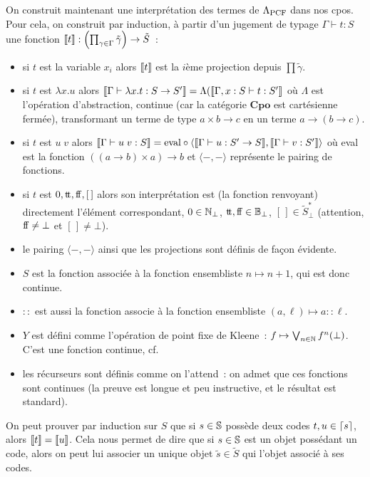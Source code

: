 \documentclass{article}
\begin{document}
On construit maintenant une interprétation des termes de $\Lambda_{\mathrm{PCF}}$ dans nos cpos. Pour cela, on construit par induction, à partir d'un jugement de typage $\Gamma\vdash t : S$ une fonction $\llbracket t \rrbracket : \left(\prod_{\gamma \in \Gamma} \tilde\gamma\right) \to \tilde S$~:
\begin{itemize}
    \item si $t$ est la variable $x_i$ alors $\llbracket t \rrbracket$ est la $i$ème projection depuis $\prod \tilde \gamma$.
    \item si $t$ est $\lambda x.u$ alors $\llbracket \Gamma\vdash \lambda x. t : S \to S' \rrbracket = \Lambda(\llbracket \Gamma, x : S\vdash t : S' \rrbracket$ où $\Lambda$ est l'opération d'abstraction, continue (car la catégorie $\mathbf{Cpo}$ est cartésienne fermée), transformant un terme de type $a\times b \to c$ en un terme $a \to (b \to c)$.
    \item si $t$ est $u\;v$ alors $\llbracket \Gamma\vdash u\;v : S \rrbracket = \mathrm{eval}\circ \langle \llbracket \Gamma\vdash u : S' \to S \rrbracket, \llbracket \Gamma\vdash v : S' \rrbracket\rangle$ où eval est la fonction $((a\to b)\times a) \to b$ et $\langle -,-\rangle$ représente le pairing de fonctions.
    \item si $t$ est $0,\mathrm{t}\!\mathrm{t},\mathrm{f}\!\mathrm{f},[\,]$ alors son interprétation est (la fonction renvoyant) directement l'élément correspondant, $0 \in \mathbb{N}_\bot$, $\mathrm{t}\!\mathrm{t}, \mathrm{f}\!\mathrm{f} \in \mathbb{B}_\bot$, $[\,] \in \tilde S^*_\bot$ (attention, $\mathrm{f}\!\mathrm{f} \neq \bot$ et $[\,] \neq \bot$).
    \item le pairing $\langle -,-\rangle$ ainsi que les projections sont définis de façon évidente.
    \item $S$ est la fonction associée à la fonction ensembliste $n \mapsto n + 1$, qui est donc continue.
    \item $::$ est aussi la fonction associe à la fonction ensembliste $(a,\ell) \mapsto a :: \ell$.
    \item $Y$ est défini comme l'opération de point fixe de Kleene~: $f \mapsto \bigvee_{n \in \mathbb{N}} f^n(\bot)$. C'est une fonction continue, cf\cite{Amadio_Curien_1998}.
    \item les récurseurs sont définis comme on l'attend~: on admet que ces fonctions sont continues (la preuve est longue et peu instructive, et le résultat est standard).
\end{itemize}

On peut prouver par induction  sur $S$ que si $s \in \mathbb{S}$ possède deux codes $t,u \in \lceil s \rceil$, alors $\llbracket t \rrbracket = \llbracket u \rrbracket$. Cela nous permet de dire que si $s \in \mathbb{S}$ est un objet possédant un code, alors on peut lui associer un unique objet $\tilde s \in \tilde S$ qui l'objet associé à ses codes.
\end{document}
